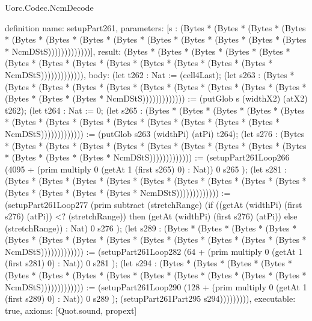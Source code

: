 \begin{lexlean}{Uorc.Codec.NcmDecode}
\begin{semanticmodule}
definition{
  name: setupPart261,
  parameters: [s : (Bytes * (Bytes * (Bytes * (Bytes * (Bytes * (Bytes * (Bytes * (Bytes * (Bytes * (Bytes * (Bytes * (Bytes * (Bytes * NcmDStS)))))))))))))],
  result: (Bytes * (Bytes * (Bytes * (Bytes * (Bytes * (Bytes * (Bytes * (Bytes * (Bytes * (Bytes * (Bytes * (Bytes * (Bytes * NcmDStS))))))))))))),
  body: (let t262 : Nat := (cell4Last); (let s263 : (Bytes * (Bytes * (Bytes * (Bytes * (Bytes * (Bytes * (Bytes * (Bytes * (Bytes * (Bytes * (Bytes * (Bytes * (Bytes * NcmDStS))))))))))))) := (putGlob s (widthX2) (atX2) t262); (let t264 : Nat := 0; (let s265 : (Bytes * (Bytes * (Bytes * (Bytes * (Bytes * (Bytes * (Bytes * (Bytes * (Bytes * (Bytes * (Bytes * (Bytes * (Bytes * NcmDStS))))))))))))) := (putGlob s263 (widthPi) (atPi) t264); (let s276 : (Bytes * (Bytes * (Bytes * (Bytes * (Bytes * (Bytes * (Bytes * (Bytes * (Bytes * (Bytes * (Bytes * (Bytes * (Bytes * NcmDStS))))))))))))) := (setupPart261Loop266 (4095 + (prim multiply 0 (getAt 1 (first s265) 0) : Nat)) 0 s265 ); (let s281 : (Bytes * (Bytes * (Bytes * (Bytes * (Bytes * (Bytes * (Bytes * (Bytes * (Bytes * (Bytes * (Bytes * (Bytes * (Bytes * NcmDStS))))))))))))) := (setupPart261Loop277 (prim subtract (stretchRange) (if ((getAt (widthPi) (first s276) (atPi)) <? (stretchRange)) then (getAt (widthPi) (first s276) (atPi)) else (stretchRange)) : Nat) 0 s276 ); (let s289 : (Bytes * (Bytes * (Bytes * (Bytes * (Bytes * (Bytes * (Bytes * (Bytes * (Bytes * (Bytes * (Bytes * (Bytes * (Bytes * NcmDStS))))))))))))) := (setupPart261Loop282 (64 + (prim multiply 0 (getAt 1 (first s281) 0) : Nat)) 0 s281 ); (let s294 : (Bytes * (Bytes * (Bytes * (Bytes * (Bytes * (Bytes * (Bytes * (Bytes * (Bytes * (Bytes * (Bytes * (Bytes * (Bytes * NcmDStS))))))))))))) := (setupPart261Loop290 (128 + (prim multiply 0 (getAt 1 (first s289) 0) : Nat)) 0 s289 ); (setupPart261Part295 s294))))))))),
  executable: true,
  axioms: [Quot.sound, propext]
}


\end{semanticmodule}
\end{lexlean}
